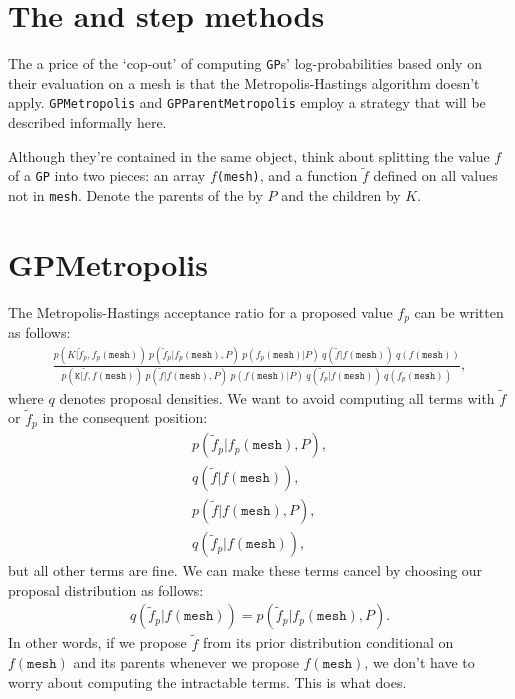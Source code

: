 \section{The  and  step methods}

The a price of the `cop-out' of computing \texttt{GP}s' log-probabilities based only on their evaluation on a mesh is that the Metropolis-Hastings algorithm doesn't apply. \texttt{GPMetropolis} and \texttt{GPParentMetropolis} employ a strategy that will be described informally here.

Although they're contained in the same object, think about splitting the value $f$ of a \texttt{GP} into two pieces: an array $f$\texttt{(mesh)}, and a function $\tilde f$ defined on all values not in \texttt{mesh}. Denote the parents of the  by $P$ and the children by $K$.

\section{GPMetropolis}
The Metropolis-Hastings acceptance ratio for a proposed value $f_p$ can be written as follows:
\begin{eqnarray*}
    \frac{p(K|\tilde f_p, f_p(\mathtt{mesh}))\ p(\tilde f_p|f_p(\mathtt{mesh}), P)\ p(f_p(\mathtt{mesh}) | P)\ q(\tilde f|f(\mathtt{mesh}))\ q(f(\mathtt{mesh}))}{p(\mathtt{K}|\tilde f, f(\mathtt{mesh}))\ p(\tilde f|f(\mathtt{mesh}), P)\ p(f(\mathtt{mesh}) | P)\ q(\tilde f_p|f(\mathtt{mesh}))\ q(f_p(\mathtt{mesh}))},
\end{eqnarray*}
where $q$ denotes proposal densities. We want to avoid computing all terms with $\tilde f$ or $\tilde f_p$ in the consequent position:
\begin{eqnarray*}
    p(\tilde f_p|f_p(\texttt{mesh}), P),\\ q(\tilde f|f(\texttt{mesh})),\\ p(\tilde f|f(\texttt{mesh}), P),\\ q(\tilde f_p|f(\texttt{mesh})),
\end{eqnarray*}
but all other terms are fine. We can make these terms cancel by choosing our proposal distribution as follows:
\begin{eqnarray*}
    q(\tilde f_p|f(\texttt{mesh})) = p(\tilde f_p|f_p(\texttt{mesh}), P).
\end{eqnarray*}
In other words, if we propose $\tilde f$ from its prior distribution conditional on $f(\texttt{mesh})$ and its parents whenever we propose $f(\texttt{mesh})$, we don't have to worry about computing the intractable terms. This is what  does.

